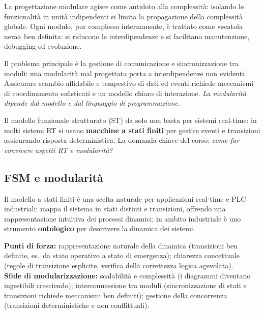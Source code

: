 \begin{intuition}
La progettazione modulare agisce come antidoto alla complessità: isolando le funzionalità in unità indipendenti si limita la propagazione della complessità globale. Ogni modulo, pur complesso internamente, è trattato come «scatola nera» ben definita: si riducono le interdipendenze e si facilitano manutenzione, debugging ed evoluzione.
\end{intuition}

\begin{note}
Il problema principale è la gestione di comunicazione e sincronizzazione tra moduli: una modularità mal progettata porta a interdipendenze non evidenti. Assicurare scambio affidabile e tempestivo di dati ed eventi richiede meccanismi di coordinamento sofisticati e un modello chiaro di interazione. \emph{La modularità dipende dal modello e dal linguaggio di programmazione.}
\end{note}

Il modello funzionale strutturato (ST) da solo non basta per sistemi real-time: in molti sistemi RT si usano \textbf{macchine a stati finiti} per gestire eventi e transizioni assicurando risposta deterministica. La domanda chiave del corso: \emph{come far convivere aspetti RT e modularità?}

\subsection{FSM e modularità}
Il modello a stati finiti è una scelta naturale per applicazioni real-time e PLC industriali: mappa il sistema in stati distinti e transizioni, offrendo una rappresentazione intuitiva dei processi dinamici; in ambito industriale è uno strumento \textbf{ontologico} per descrivere la dinamica dei sistemi.

\begin{note}
\textbf{Punti di forza:} rappresentazione naturale della dinamica (transizioni ben definite, es.\ da stato operativo a stato di emergenza); chiarezza concettuale (regole di transizione esplicite, verifica della correttezza logica agevolata).\\
\textbf{Sfide di modularizzazione:} scalabilità e complessità (i diagrammi diventano ingestibili cresciendo); interconnessione tra moduli (sincronizzazione di stati e transizioni richiede meccanismi ben definiti); gestione della concorrenza (transizioni deterministiche e non conflittuali).
\end{note}

